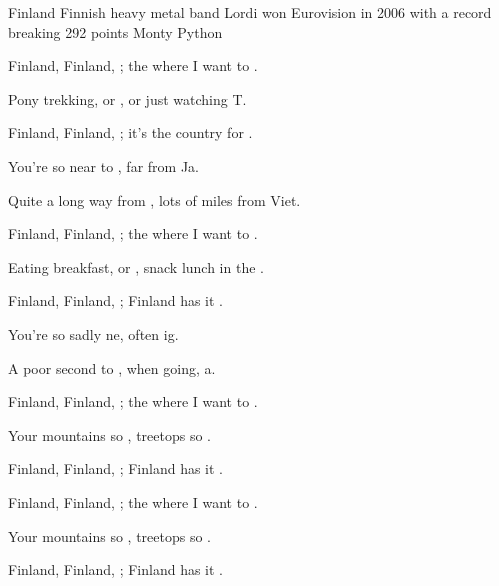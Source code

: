 \begin{SBSong}{Finland}
  {Finnish heavy metal band Lordi won Eurovision in 2006 with a record breaking 292 points}
  {Monty Python}
  \begin{SBChorus}
     Finland, Finland, ; the  where I want to .

    Pony trekking, or , or just watching T.

     Finland, Finland, ;  it's the country for .
  \end{SBChorus}
  \begin{SBVerse}
     You're so near to ,  far from Ja.

    Quite a long way from ,  lots of miles from Viet.
  \end{SBVerse}
  \begin{SBChorus}
     Finland, Finland, ; the  where I want to .
    
    Eating breakfast, or ,  snack lunch in the .
    
     Finland, Finland, ; Finland has it .
  \end{SBChorus}
  \begin{SBVerse}
     You're so sadly ne,  often ig.
    
    A poor second to ,  when going, a.
  \end{SBVerse}
  \begin{SBChorus}
     Finland, Finland, ; the  where I want to .

    Your mountains so ,  treetops so .

     Finland, Finland, ; Finland has it .
  \end{SBChorus}
  \begin{SBChorus}
     Finland, Finland, ; the  where I want to .

    Your mountains so ,  treetops so .

     Finland, Finland, ; Finland has it .
  \end{SBChorus}
\end{SBSong}
  
